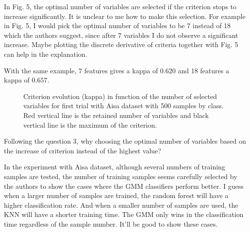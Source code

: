\documentclass[a4paper,10pt,DIV=16]{scrartcl}
\begin{document}
\begin{revbox}
  In Fig. 5, the optimal number of variables are selected if the criterion stops to increase significantly. It is unclear to me how to make this selection. For example in Fig. 5, I would pick the optimal number of variables to be 7 instead of 18 which the authors suggest, since after 7 variables I do not observe a significant increase. Maybe plotting the discrete derivative of criteria together with Fig. 5 can help in the explanation.
  \begin{resbox}
  With the same example, 7 features gives a kappa of $0.620$ and 18 features a kappa of $0.657$.

  \end{resbox}
\end{revbox}

  \begin{figure}[!ht]
      \centering
      \caption{Criterion evolution (kappa) in function of the number of selected variables for first trial with Aisa dataset with 500 samples by class. Red vertical line is the retained number of variables and black vertical line is the maximum of the criterion.}
  \end{figure}

\begin{revbox}
  Following the question 3, why choosing the optimal number of variables based on the increase of criterion instead of the highest value?
  \begin{resbox}

  \end{resbox}
\end{revbox}

\begin{revbox}
  In the experiment with Aisa dataset, although several numbers of training samples are tested, the number of training samples seems carefully selected by the authors to show the cases where the GMM classifiers perform better. I guess when a larger number of samples are trained, the random forest will have a higher classification rate. And when a smaller number of samples are used, the KNN will have a shorter training time. The GMM only wins in the classification time regardless of the sample number. It’ll be good to show these cases.
  \begin{resbox}
  \end{resbox}
\end{revbox}
\end{document}
